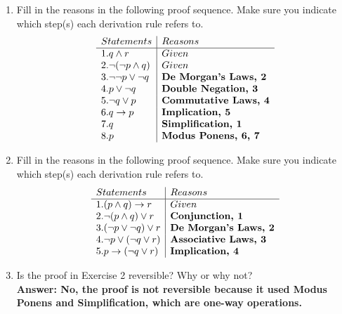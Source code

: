 \documentclass[12pt]{article}
\begin{document}
\begin{enumerate}
\item 
Fill in the reasons in the following proof sequence. Make sure you indicate \\ which step(s) each derivation rule refers to.
\begin{displaymath}
  \begin{array}{l|l c|c|c|c|c|}
  Statements & Reasons \\%
  \hline %
  1. q \wedge r & Given \\
  2. \neg(\neg p \wedge q) & Given \\
  3. \neg \neg p \vee \neg q & \textbf{De Morgan's Laws, 2} \\
  4. p \vee \neg q & \textbf{Double Negation, 3} \\
  5. \neg q \vee p & \textbf{Commutative Laws, 4}\\
  6. q \rightarrow p & \textbf{Implication, 5}\\
  7. q & \textbf{Simplification, 1}\\
  8. p & \textbf{Modus Ponens, 6, 7}\\
  \end{array}
\end{displaymath}

\item 
Fill in the reasons in the following proof sequence. Make sure you indicate which step(s) each derivation rule refers to.
\begin{displaymath}
  \begin{array}{l|l c|c|c|c|c|}
  Statements & Reasons \\%
  \hline %
  1. (p \wedge q) \rightarrow r & Given \\
  2. \neg (p \wedge q) \vee r & \textbf{Conjunction, 1}  \\
  3. (\neg p \vee \neg q) \vee r& \textbf{De Morgan's Laws, 2} \\
  4. \neg p \vee (\neg q \vee r) & \textbf{Associative Laws, 3} \\
  5. p \rightarrow (\neg q \vee r) & \textbf{Implication, 4}\\
  \end{array}
\end{displaymath}

\newpage
\item 
Is the proof in Exercise 2 reversible? Why or why not?\\
\textbf{Answer: No, the proof is not reversible because it used Modus Ponens and Simplification, which are one-way operations.}


\end{enumerate}
\end{document}
